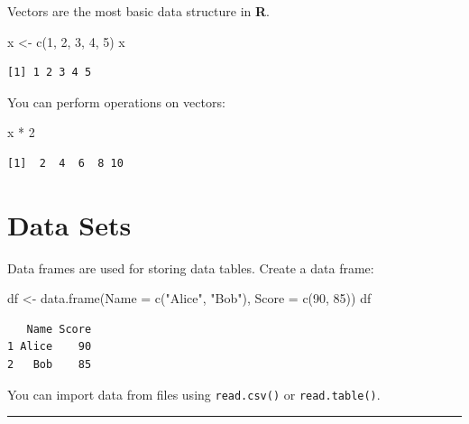 \documentclass[
  letterpaper,
  DIV=11,
  numbers=noendperiod]{scrreprt}
\newenvironment{Shaded}{\begin{snugshade}}{\end{snugshade}}
\newcommand{\AttributeTok}[1]{\textcolor[rgb]{0.40,0.45,0.13}{#1}}
\newcommand{\DecValTok}[1]{\textcolor[rgb]{0.68,0.00,0.00}{#1}}
\newcommand{\FunctionTok}[1]{\textcolor[rgb]{0.28,0.35,0.67}{#1}}
\newcommand{\NormalTok}[1]{\textcolor[rgb]{0.00,0.23,0.31}{#1}}
\newcommand{\OtherTok}[1]{\textcolor[rgb]{0.00,0.23,0.31}{#1}}
\newcommand{\SpecialCharTok}[1]{\textcolor[rgb]{0.37,0.37,0.37}{#1}}
\newcommand{\StringTok}[1]{\textcolor[rgb]{0.13,0.47,0.30}{#1}}
\begin{document}
Vectors are the most basic data structure in \textbf{R}.

\begin{Shaded}
\begin{Highlighting}[]
\NormalTok{x }\OtherTok{\textless{}{-}} \FunctionTok{c}\NormalTok{(}\DecValTok{1}\NormalTok{, }\DecValTok{2}\NormalTok{, }\DecValTok{3}\NormalTok{, }\DecValTok{4}\NormalTok{, }\DecValTok{5}\NormalTok{)}
\NormalTok{x}
\end{Highlighting}
\end{Shaded}

\begin{verbatim}
[1] 1 2 3 4 5
\end{verbatim}

You can perform operations on vectors:

\begin{Shaded}
\begin{Highlighting}[]
\NormalTok{x }\SpecialCharTok{*} \DecValTok{2}
\end{Highlighting}
\end{Shaded}

\begin{verbatim}
[1]  2  4  6  8 10
\end{verbatim}

\section{Data Sets}\label{data-sets}

Data frames are used for storing data tables. Create a data frame:

\begin{Shaded}
\begin{Highlighting}[]
\NormalTok{df }\OtherTok{\textless{}{-}} \FunctionTok{data.frame}\NormalTok{(}\AttributeTok{Name =} \FunctionTok{c}\NormalTok{(}\StringTok{"Alice"}\NormalTok{, }\StringTok{"Bob"}\NormalTok{), }\AttributeTok{Score =} \FunctionTok{c}\NormalTok{(}\DecValTok{90}\NormalTok{, }\DecValTok{85}\NormalTok{))}
\NormalTok{df}
\end{Highlighting}
\end{Shaded}

\begin{verbatim}
   Name Score
1 Alice    90
2   Bob    85
\end{verbatim}

You can import data from files using \texttt{read.csv()} or
\texttt{read.table()}.

\begin{center}\rule{0.5\linewidth}{0.5pt}\end{center}
\end{document}
